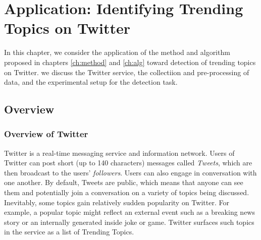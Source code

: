\chapter{Application: Identifying Trending Topics on Twitter}
\label{ch:data}


In this chapter, we consider the application of the method and algorithm proposed
in chapters \ref{ch:method} and \ref{ch:alg} toward detection of trending topics
on Twitter. we discuss the Twitter service, the collectiion and pre-processing of
data, and the experimental setup for the detection task.

\section{Overview}
\subsection{Overview of Twitter}
Twitter is a real-time messaging service and information network. Users of
Twitter can post short (up to 140 characters) messages called {\em Tweets},
which are then broadcast to the users' {\em followers}. Users can also engage in
conversation with one another. By default, Tweets are public, which means that
anyone can see them and potentially join a conversation on a variety of topics
being discussed. Inevitably, some topics gain relatively sudden popularity on
Twitter. For example, a popular topic might reflect an external event such as a
breaking news story or an internally generated inside joke or game. Twitter
surfaces such topics in the service as a list of Trending Topics. 

